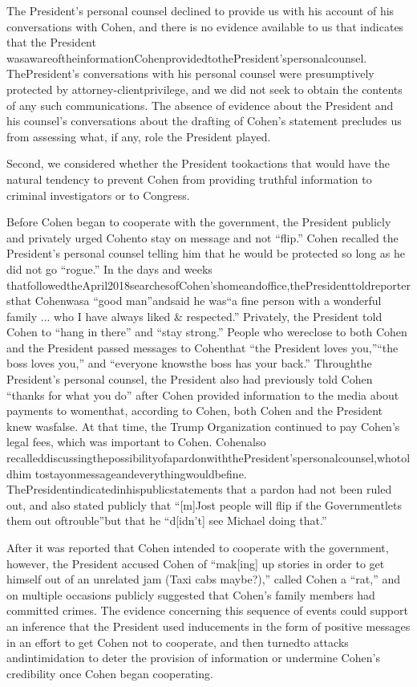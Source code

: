 {The President’s personal counsel declined to provide us with his account of his conversations with Cohen, and there is no evidence available to us that indicates that the President wasawareoftheinformationCohenprovidedtothePresident’spersonalcounsel. ThePresident’s conversations with his personal counsel were presumptively protected by attorney-clientprivilege, and we did not seek to obtain the contents of any such communications. The absence of evidence about the President and his counsel’s conversations about the drafting of Cohen’s statement precludes us from assessing what, if any, role the President played.

Second, we considered whether the President tookactions that would have the natural tendency to prevent Cohen from providing truthful information to criminal investigators or to Congress.

Before Cohen began to cooperate with the government, the President publicly and privately urged Cohento stay on message and not “flip.” Cohen recalled the President’s personal counsel telling him that he would be protected so long as he did not go “rogue.” In the days and weeks thatfollowedtheApril2018searchesofCohen’shomeandoffice,thePresidenttoldreportersthat Cohenwasa “good man”andsaid he was“a fine person with a wonderful family ... who I have always liked & respected.” Privately, the President told Cohen to “hang in there” and “stay strong.” People who wereclose to both Cohen and the President passed messages to Cohenthat “the President loves you,”“the boss loves you,” and “everyone knowsthe boss has your back.” Throughthe President’s personal counsel, the President also had previously told Cohen “thanks for what you do” after Cohen provided information to the media about payments to womenthat, according to Cohen, both Cohen and the President knew wasfalse. At that time, the Trump Organization continued to pay Cohen’s legal fees, which was important to Cohen. Cohenalso recalleddiscussingthepossibilityofapardonwiththePresident’spersonalcounsel,whotoldhim tostayonmessageandeverythingwouldbefine. ThePresidentindicatedinhispublicstatements that a pardon had not been ruled out, and also stated publicly that “[m]Jost people will flip if the Governmentlets them out oftrouble”but that he “d[idn’t] see Michael doing that.”

After it was reported that Cohen intended to cooperate with the government, however, the President accused Cohen of “mak[ing] up stories in order to get himself out of an unrelated jam (Taxi cabs maybe?),” called Cohen a “rat,” and on multiple occasions publicly suggested that Cohen’s family members had committed crimes. The evidence concerning this sequence of events could support an inference that the President used inducements in the form of positive messages in an effort to get Cohen not to cooperate, and then turnedto attacks andintimidation to deter the provision of information or undermine Cohen’s credibility once Cohen began cooperating.

}
